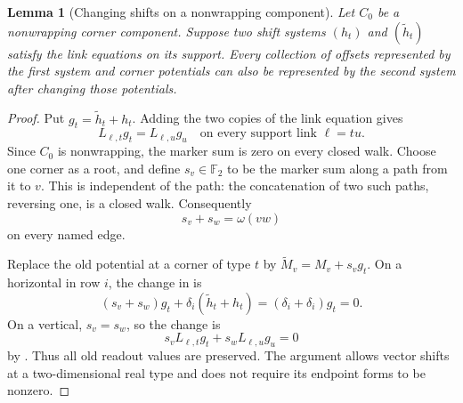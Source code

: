 \documentclass[11pt]{article}
\newtheorem{lemma}[theorem]{Lemma}
\theoremstyle{definition}
\begin{document}
\begin{lemma}[Changing shifts on a nonwrapping component]
\label{offset:lem-gauge}
Let \(C_0\) be a nonwrapping corner component. Suppose two shift systems
\((h_t)\) and \((\widetilde h_t)\) satisfy the link equations on its
support. Every collection of offsets represented by the first system
and corner potentials can also be represented by the second system
after changing those potentials.
\end{lemma}

\begin{proof}
Put \(g_t=\widetilde h_t+h_t\). Adding the two copies of the link
equation gives
\begin{equation}
   L_{\ell,t}g_t=L_{\ell,u}g_u
   \quad\text{on every support link }\ell=tu.
   \label{offset:eq-shift-difference}
\end{equation}
Since \(C_0\) is nonwrapping, the marker sum is zero on every closed walk.
Choose one corner as a root, and define \(s_v\in\mathbb F_2\) to be the marker sum
along a path from it to \(v\). This is independent of the path: the
concatenation of two such paths, reversing one, is a closed walk.
Consequently
\[
     s_v+s_w=\omega(vw)
\]
on every named edge.

Replace the old potential at a corner of type \(t\) by
\(\widetilde M_v=M_v+s_vg_t\). On a horizontal in row \(i\), the change
in  is
\[
 (s_v+s_w)g_t+\delta_i(\widetilde h_t+h_t)
       =(\delta_i+\delta_i)g_t=0.
\]
On a vertical, \(s_v=s_w\), so the change is
\[
 s_vL_{\ell,t}g_t+s_wL_{\ell,u}g_u=0
\]
by . Thus all old readout values are
preserved. The argument allows vector shifts at a two-dimensional
real type and does not require its endpoint forms to be nonzero.
\end{proof}
\end{document}
